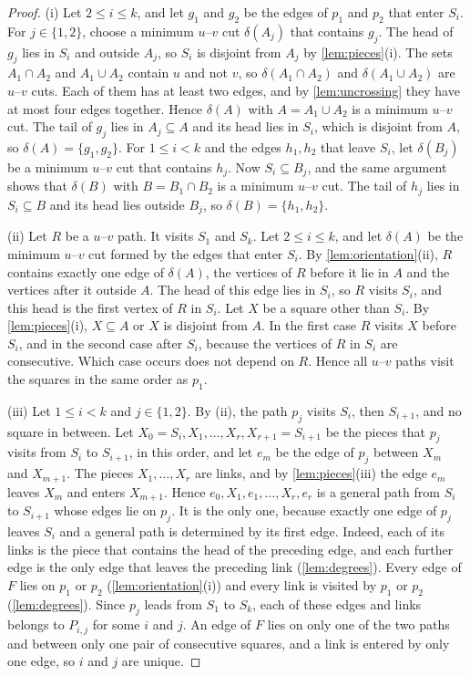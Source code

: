 \documentclass[pdflatex,sn-mathphys-num]{sn-jnl}%
\theoremstyle{thmstyleone}%
\theoremstyle{thmstyletwo}%
\theoremstyle{thmstylethree}%
\begin{document}
\begin{proof}
(i) Let $2 \leq i \leq k$, and let $g_1$ and $g_2$ be the edges of $p_1$ and $p_2$ that enter $S_i$.
For $j \in \{1, 2\}$, choose a minimum $u$--$v$ cut $\delta(A_j)$ that contains $g_j$.
The head of $g_j$ lies in $S_i$ and outside $A_j$, so $S_i$ is disjoint from $A_j$ by \cref{lem:pieces}(i).
The sets $A_1 \cap A_2$ and $A_1 \cup A_2$ contain $u$ and not $v$, so $\delta(A_1 \cap A_2)$ and $\delta(A_1 \cup A_2)$ are $u$--$v$ cuts.
Each of them has at least two edges, and by \cref{lem:uncrossing} they have at most four edges together.
Hence $\delta(A)$ with $A = A_1 \cup A_2$ is a minimum $u$--$v$ cut.
The tail of $g_j$ lies in $A_j \subseteq A$ and its head lies in $S_i$, which is disjoint from $A$, so $\delta(A) = \{g_1, g_2\}$.
For $1 \leq i < k$ and the edges $h_1, h_2$ that leave $S_i$, let $\delta(B_j)$ be a minimum $u$--$v$ cut that contains $h_j$.
Now $S_i \subseteq B_j$, and the same argument shows that $\delta(B)$ with $B = B_1 \cap B_2$ is a minimum $u$--$v$ cut.
The tail of $h_j$ lies in $S_i \subseteq B$ and its head lies outside $B_j$, so $\delta(B) = \{h_1, h_2\}$.

(ii) Let $R$ be a $u$--$v$ path.
It visits $S_1$ and $S_k$.
Let $2 \leq i \leq k$, and let $\delta(A)$ be the minimum $u$--$v$ cut formed by the edges that enter $S_i$.
By \cref{lem:orientation}(ii), $R$ contains exactly one edge of $\delta(A)$, the vertices of $R$ before it lie in $A$ and the vertices after it outside $A$.
The head of this edge lies in $S_i$, so $R$ visits $S_i$, and this head is the first vertex of $R$ in $S_i$.
Let $X$ be a square other than $S_i$.
By \cref{lem:pieces}(i), $X \subseteq A$ or $X$ is disjoint from $A$.
In the first case $R$ visits $X$ before $S_i$, and in the second case after $S_i$, because the vertices of $R$ in $S_i$ are consecutive.
Which case occurs does not depend on $R$.
Hence all $u$--$v$ paths visit the squares in the same order as $p_1$.

(iii) Let $1 \leq i < k$ and $j \in \{1, 2\}$.
By (ii), the path $p_j$ visits $S_i$, then $S_{i+1}$, and no square in between.
Let $X_0 = S_i, X_1, \dots, X_r, X_{r+1} = S_{i+1}$ be the pieces that $p_j$ visits from $S_i$ to $S_{i+1}$, in this order, and let $e_m$ be the edge of $p_j$ between $X_m$ and $X_{m+1}$.
The pieces $X_1, \dots, X_r$ are links, and by \cref{lem:pieces}(iii) the edge $e_m$ leaves $X_m$ and enters $X_{m+1}$.
Hence $e_0, X_1, e_1, \dots, X_r, e_r$ is a general path from $S_i$ to $S_{i+1}$ whose edges lie on $p_j$.
It is the only one, because exactly one edge of $p_j$ leaves $S_i$ and a general path is determined by its first edge.
Indeed, each of its links is the piece that contains the head of the preceding edge, and each further edge is the only edge that leaves the preceding link (\cref{lem:degrees}).
Every edge of $F$ lies on $p_1$ or $p_2$ (\cref{lem:orientation}(i)) and every link is visited by $p_1$ or $p_2$ (\cref{lem:degrees}).
Since $p_j$ leads from $S_1$ to $S_k$, each of these edges and links belongs to $P_{i,j}$ for some $i$ and $j$.
An edge of $F$ lies on only one of the two paths and between only one pair of consecutive squares, and a link is entered by only one edge, so $i$ and $j$ are unique.


\end{proof}
\end{document}
